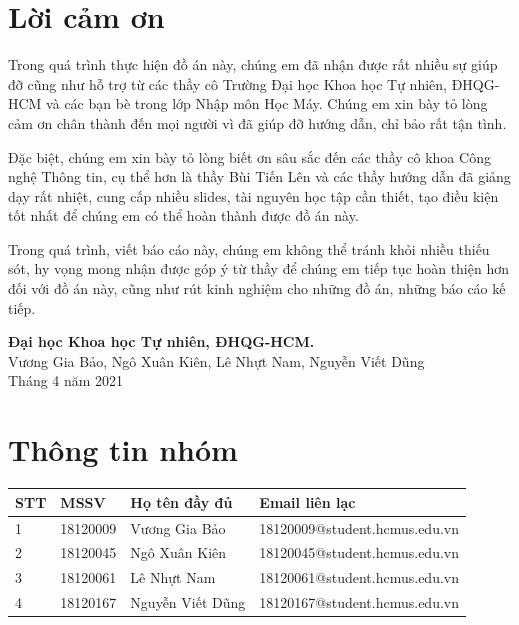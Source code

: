 \documentclass{article}
\begin{document}
	\section*{Lời cảm ơn}
	\vspace{1.0in}
	\begingroup
	\setlength{\parindent}{0pt}
	\qquad Trong quá trình thực hiện đồ án này, chúng em đã nhận được rất nhiều sự giúp đỡ cũng như hỗ trợ từ các thầy cô Trường Đại học Khoa học Tự nhiên, ĐHQG-HCM và các bạn bè trong lớp Nhập môn Học Máy. Chúng em xin bày tỏ lòng cảm ơn chân thành đến mọi người vì đã giúp đỡ hướng dẫn, chỉ bảo rất tận tình.
	
	\qquad Đặc biệt, chúng em xin bày tỏ lòng biết ơn sâu sắc đến các thầy cô khoa Công nghệ Thông tin, cụ thể hơn là thầy Bùi Tiến Lên và các thầy hướng dẫn đã giảng dạy rất nhiệt, cung cấp nhiều slides, tài nguyên học tập cần thiết, tạo điều kiện tốt nhất để chúng em có thể hoàn thành được đồ án này.
	
	\qquad Trong quá trình, viết báo cáo này, chúng em không thể tránh khỏi nhiều thiếu sót, hy vọng mong nhận được góp ý từ thầy để chúng em tiếp tục hoàn thiện hơn đối với đồ án này, cũng như rút kinh nghiệm cho những đồ án, những báo cáo kế tiếp.
	
	\vspace{1.0in}
	\textbf{Đại học Khoa học Tự nhiên, ĐHQG-HCM.}\\
	Vương Gia Bảo, Ngô Xuân Kiên, Lê Nhựt Nam, Nguyễn Viết Dũng\\
	Tháng 4 năm 2021\\
	\endgroup
	
	\newpage
	\tableofcontents
	\newpage
	\setcounter{secnumdepth}{0}
	
	\section{Thông tin nhóm}
	\begin{table}[H]
		\centering
		\begin{tabular}{ | p{1cm} |  p{3cm} | p{5cm} | p{5cm}  |}\hline
			STT	& MSSV & Họ tên đầy đủ & Email liên lạc \\\hline
			1 & 18120009 & Vương Gia Bảo & 18120009@student.hcmus.edu.vn  \\ \hline
			2 & 18120045 & Ngô Xuân Kiên & 18120045@student.hcmus.edu.vn \\ \hline
			3 & 18120061 & Lê Nhựt Nam & 18120061@student.hcmus.edu.vn  \\ \hline
			4 & 18120167 & Nguyễn Viết Dũng &  18120167@student.hcmus.edu.vn \\ \hline
		\end{tabular}
	\end{table}
\end{document}
